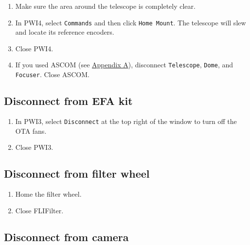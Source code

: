 \documentclass{article}
\begin{document}
	\begin{enumerate}
		
		\item Make sure the area around the telescope is completely clear.
		
		\item In PWI4, select \texttt{Commands} and then click \texttt{Home Mount}. The telescope will slew and locate its reference encoders.
		
		\item Close PWI4.
		
		\item If you used ASCOM (see \hyperref[sec:set-up-ascom]{Appendix A}), disconnect \texttt{Telescope}, \texttt{Dome}, and \texttt{Focuser}. Close ASCOM.
		
	\end{enumerate}

	\subsection{Disconnect from EFA kit}
	
	\begin{enumerate}
	
		\item In PWI3, select \texttt{Disconnect} at the top right of the window to turn off the OTA fans.
		
		\item Close PWI3.
		
	\end{enumerate}

	\subsection{Disconnect from filter wheel}
	\label{sec:disconnect-from-filter-wheel}
	
	\begin{enumerate}
		
		\item Home the filter wheel.
				
		\item Close FLIFilter.
		
	\end{enumerate}
	
	\subsection{Disconnect from camera}
	\label{sec:disconnect-from-camera}
	
\end{document}
